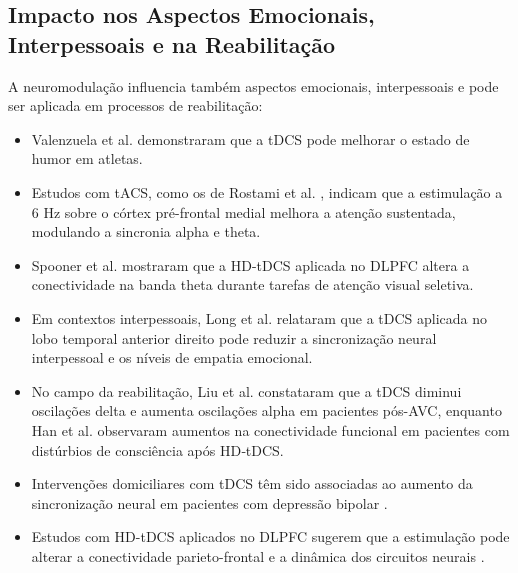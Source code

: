 \subsection{Impacto nos Aspectos Emocionais, Interpessoais e na Reabilitação}
A neuromodulação influencia também aspectos emocionais, interpessoais e pode ser aplicada em processos de reabilitação:
\begin{itemize}
    \item Valenzuela et al. \cite{valenzuela2019enhancement} demonstraram que a tDCS pode melhorar o estado de humor em atletas.
    \item Estudos com tACS, como os de Rostami et al. \cite{rostami2020transcranial}, indicam que a estimulação a 6 Hz sobre o córtex pré-frontal medial melhora a atenção sustentada, modulando a sincronia alpha e theta.
    \item Spooner et al. \cite{spooner2020hdtdcs} mostraram que a HD-tDCS aplicada no DLPFC altera a conectividade na banda theta durante tarefas de atenção visual seletiva.
    \item Em contextos interpessoais, Long et al. \cite{long2023transcranial} relataram que a tDCS aplicada no lobo temporal anterior direito pode reduzir a sincronização neural interpessoal e os níveis de empatia emocional.
    \item No campo da reabilitação, Liu et al. \cite{liu2023effects} constataram que a tDCS diminui oscilações delta e aumenta oscilações alpha em pacientes pós-AVC, enquanto Han et al. \cite{han2022functional} observaram aumentos na conectividade funcional em pacientes com distúrbios de consciência após HD‑tDCS.
    \item Intervenções domiciliares com tDCS têm sido associadas ao aumento da sincronização neural em pacientes com depressão bipolar \cite{xiao2025enhanced}.
    \item Estudos com HD-tDCS aplicados no DLPFC sugerem que a estimulação pode alterar a conectividade parieto-frontal e a dinâmica dos circuitos neurais \cite{arif2021high}.
\end{itemize}

